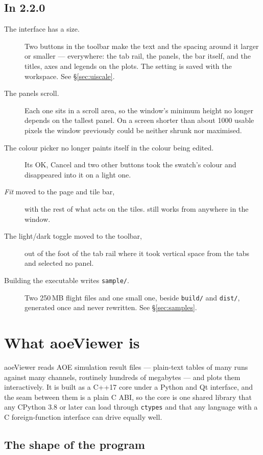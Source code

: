 \documentclass[11pt,a4paper,oneside]{report}
\newcommand{\appver}{2.2.0}
\newcommand{\code}[1]{\texttt{#1}}
\newcommand{\key}[1]{\textsf{\small\fbox{#1}}}
\begin{document}
\section{In \appver}

\begin{description}
\item[The interface has a size.] Two buttons in the toolbar make the text and the
  spacing around it larger or smaller --- everywhere: the tab rail, the
  panels, the bar itself, and the titles, axes and legends on the plots. The
  setting is saved with the workspace. See \S\ref{sec:uiscale}.
\item[The panels scroll.] Each one sits in a scroll area, so the window's minimum
  height no longer depends on the tallest panel. On a screen shorter than
  about 1000 usable pixels the window previously could be neither shrunk nor
  maximised.
\item[The colour picker no longer paints itself in the colour being edited.] Its OK,
  Cancel and two other buttons took the swatch's colour and disappeared into
  it on a light one.
\item[\emph{Fit} moved to the page and tile bar,] with the rest of what acts on the
  tiles. \key{Ctrl+0} still works from anywhere in the window.
\item[The light/dark toggle moved to the toolbar,] out of the foot of the tab rail
  where it took vertical space from the tabs and selected no panel.
\item[Building the executable writes \code{sample/}.] Two 250\,MB flight files and one
  small one, beside \code{build/} and \code{dist/}, generated once and never
  rewritten. See \S\ref{sec:samples}.
\end{description}

\chapter{What aoeViewer is}

aoeViewer reads AOE simulation result files --- plain-text tables of many runs
against many channels, routinely hundreds of megabytes --- and plots them
interactively. It is built as a C++17 core under a Python and Qt interface, and
the seam between them is a plain C ABI, so the core is one shared library that
any CPython 3.8 or later can load through \code{ctypes} and that any language
with a C foreign-function interface can drive equally well.

\section{The shape of the program}
\end{document}
